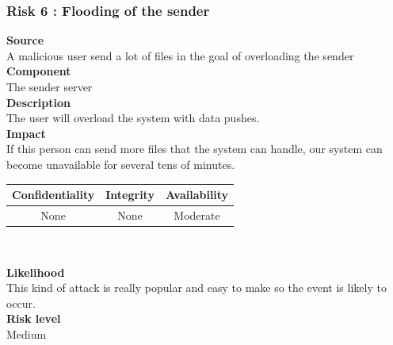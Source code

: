 \documentclass[a4paper,11pt]{article}
\begin{document}
\subsubsection{Risk 6 : Flooding of the sender }
\textbf{Source} \\A malicious user send a lot of files in the goal of overloading the sender\\
\textbf{Component} \\The sender server\\
\textbf{Description}\\ The user will overload the system with data pushes. 
\\
\textbf{Impact}\\
 If this person can send more files that the system can handle, our system can become unavailable for several tens of minutes. \\
 \begin{center}
\begin{tabular}{|c|c|c|}
\hline
\textbf{Confidentiality} & \textbf{Integrity} & \textbf{Availability} \\
\hline
None & None & Moderate \\
\hline
\end{tabular}\\
\end{center}
\textbf{Likelihood}\\ This kind of attack is really popular and easy to make so the event is likely to occur.\\
\textbf{Risk level}\\Medium\\
\end{document}

